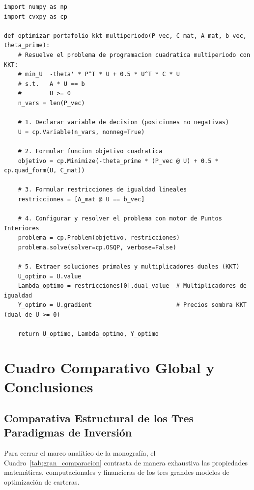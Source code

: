 \documentclass[11pt,a4paper]{report}
\numberwithin{equation}{chapter}
\begin{document}
\begin{tcolorbox}[colback=black!5!white,colframe=navyblue,arc=2mm,title=\textbf{Script de Optimización KKT Multiperiodo en Python (CVXPY)}]
\small
\begin{verbatim}
import numpy as np
import cvxpy as cp

def optimizar_portafolio_kkt_multiperiodo(P_vec, C_mat, A_mat, b_vec, theta_prime):
    # Resuelve el problema de programacion cuadratica multiperiodo con KKT:
    # min_U  -theta' * P^T * U + 0.5 * U^T * C * U
    # s.t.   A * U == b
    #        U >= 0
    n_vars = len(P_vec)
    
    # 1. Declarar variable de decision (posiciones no negativas)
    U = cp.Variable(n_vars, nonneg=True)
    
    # 2. Formular funcion objetivo cuadratica
    objetivo = cp.Minimize(-theta_prime * (P_vec @ U) + 0.5 * cp.quad_form(U, C_mat))
    
    # 3. Formular restricciones de igualdad lineales
    restricciones = [A_mat @ U == b_vec]
    
    # 4. Configurar y resolver el problema con motor de Puntos Interiores
    problema = cp.Problem(objetivo, restricciones)
    problema.solve(solver=cp.OSQP, verbose=False)
    
    # 5. Extraer soluciones primales y multiplicadores duales (KKT)
    U_optimo = U.value
    Lambda_optimo = restricciones[0].dual_value  # Multiplicadores de igualdad
    Y_optimo = U.gradient                        # Precios sombra KKT (dual de U >= 0)
    
    return U_optimo, Lambda_optimo, Y_optimo
\end{verbatim}
\end{tcolorbox}

\chapter{Cuadro Comparativo Global y Conclusiones}

\section{Comparativa Estructural de los Tres Paradigmas de Inversión}

Para cerrar el marco analítico de la monografía, el Cuadro~\ref{tab:gran_comparacion} contrasta de manera exhaustiva las propiedades matemáticas, computacionales y financieras de los tres grandes modelos de optimización de carteras.
\end{document}
